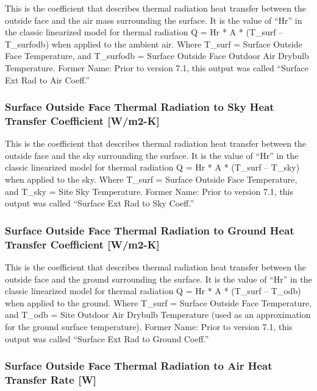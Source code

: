 This is the coefficient that describes thermal radiation heat transfer between the outside face and the air mass surrounding the surface. It is the value of ``Hr'' in the classic linearized model for thermal radiation Q = Hr * A * (T\_surf -- T\_surfodb) when applied to the ambient air. Where T\_surf = Surface Outside Face Temperature, and T\_surfodb = Surface Outside Face Outdoor Air Drybulb Temperature. Former Name: Prior to version 7.1, this output was called ``Surface Ext Rad to Air Coeff.''

\subsubsection{Surface Outside Face Thermal Radiation to Sky Heat Transfer Coefficient {[}W/m2-K{]}}\label{surface-outside-face-thermal-radiation-to-sky-heat-transfer-coefficient-wm2-k}

This is the coefficient that describes thermal radiation heat transfer between the outside face and the sky surrounding the surface. It is the value of ``Hr'' in the classic linearized model for thermal radiation Q = Hr * A * (T\_surf -- T\_sky) when applied to the sky. Where T\_surf = Surface Outside Face Temperature, and T\_sky = Site Sky Temperature. Former Name: Prior to version 7.1, this output was called ``Surface Ext Rad to Sky Coeff.''

\subsubsection{Surface Outside Face Thermal Radiation to Ground Heat Transfer Coefficient {[}W/m2-K{]}}\label{surface-outside-face-thermal-radiation-to-ground-heat-transfer-coefficient-wm2-k}

This is the coefficient that describes thermal radiation heat transfer between the outside face and the ground surrounding the surface. It is the value of ``Hr'' in the classic linearized model for thermal radiation Q = Hr * A * (T\_surf -- T\_odb) when applied to the ground. Where T\_surf = Surface Outside Face Temperature, and T\_odb = Site Outdoor Air Drybulb Temperature (used as an approximation for the ground surface temperature). Former Name: Prior to version 7.1, this output was called ``Surface Ext Rad to Ground Coeff.''

\subsubsection{Surface Outside Face Thermal Radiation to Air Heat Transfer Rate {[}W{]}}\label{surface-outside-face-thermal-radiation-to-air-heat-transfer-rate-w}

